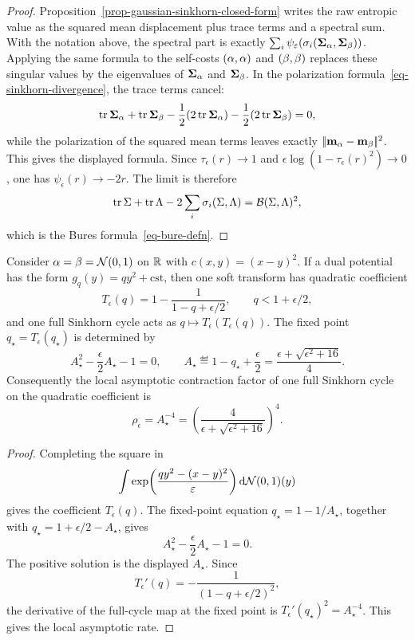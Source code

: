 \begin{proof}
	Proposition~\ref{prop-gaussian-sinkhorn-closed-form} writes the raw entropic value as the squared mean displacement plus trace terms and a spectral sum. With the notation above, the spectral part is exactly $\sum_i\psi_\varepsilon(\sigma_i(\mathbf{\Sigma}_\alpha,\mathbf{\Sigma}_\beta))$. Applying the same formula to the self-costs $(\alpha,\alpha)$ and $(\beta,\beta)$ replaces these singular values by the eigenvalues of $\mathbf{\Sigma}_\alpha$ and $\mathbf{\Sigma}_\beta$. In the polarization formula~\eqref{eq-sinkhorn-divergence}, the trace terms cancel:
	\[
		\operatorname{tr}\mathbf{\Sigma}_\alpha+\operatorname{tr}\mathbf{\Sigma}_\beta
		-\frac12(2\operatorname{tr}\mathbf{\Sigma}_\alpha)
		-\frac12(2\operatorname{tr}\mathbf{\Sigma}_\beta)=0,
	\]
	while the polarization of the squared mean terms leaves exactly $|\!| \mathbf{m}_\alpha-\mathbf{m}_\beta |\!|^2$. This gives the displayed formula. Since $\tau_\epsilon(r)\to1$ and $\epsilon\log(1-\tau_\epsilon(r)^2)\to0$, one has $\psi_\epsilon(r)\to-2r$. The limit is therefore
	\[
		\operatorname{tr}\Sigma+\operatorname{tr}\Lambda
		-2\sum_i\sigma_i(\Sigma,\Lambda)
		=
		\mathcal{B}(\Sigma,\Lambda)^2,
	\]
	which is the Bures formula~\eqref{eq-bure-defn}.
\end{proof}

\begin{prop}\label{prop-gaussian-sinkhorn-1d-rate}
	Consider $\alpha=\beta=\mathcal{N}(0,1)$ on $\mathbb{R}$ with $c(x,y)=(x-y)^2$. If a dual potential has the form $g_q(y)=q y^2+\mathrm{cst}$, then one soft transform has quadratic coefficient
	\[
		T_\epsilon(q)
		=
		1-\frac{1}{1-q+\epsilon/2},
		\qquad q<1+\epsilon/2,
	\]
	and one full Sinkhorn cycle acts as $q\mapsto T_\epsilon(T_\epsilon(q))$. The fixed point $q_\star=T_\epsilon(q_\star)$ is determined by
	\[
		A_\star^2-\frac{\epsilon}{2}A_\star-1=0,
		\qquad
		A_\star\eqdef 1-q_\star+\frac{\epsilon}{2}
		=
		\frac{\epsilon+\sqrt{\epsilon^2+16}}{4}.
	\]
	Consequently the local asymptotic contraction factor of one full Sinkhorn cycle on the quadratic coefficient is
	\[
		\rho_\epsilon=A_\star^{-4}
		=
		\left(\frac{4}{\epsilon+\sqrt{\epsilon^2+16}}\right)^4 .
	\]
\end{prop}

\begin{proof}
	Completing the square in
	\[
		\int
		\exp\!\left(\frac{q y^2-(x-y)^2}{\varepsilon}\right)
		\mathrm{d}\mathcal{N}(0,1)(y)
	\]
	gives the coefficient $T_\epsilon(q)$. The fixed-point equation $q_\star=1-1/A_\star$, together with $q_\star=1+\epsilon/2-A_\star$, gives
	\[
		A_\star^2-\frac{\epsilon}{2}A_\star-1=0.
	\]
	The positive solution is the displayed $A_\star$. Since
	\[
		T_\epsilon'(q)=-\frac{1}{(1-q+\epsilon/2)^2},
	\]
	the derivative of the full-cycle map at the fixed point is $T_\epsilon'(q_\star)^2=A_\star^{-4}$. This gives the local asymptotic rate.
\end{proof}

